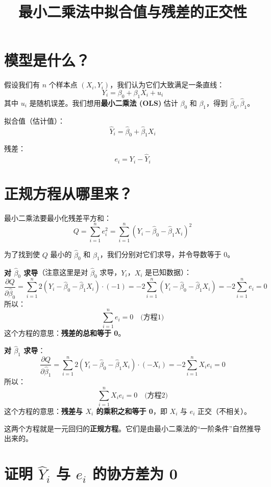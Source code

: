 \documentclass[12pt]{article}
\title{最小二乘法中拟合值与残差的正交性}
\author{}
\date{}
\begin{document}
\maketitle

\section{模型是什么？}

假设我们有 \(n\) 个样本点 \((X_i, Y_i)\)，我们认为它们大致满足一条直线：
\[
Y_i = \beta_0 + \beta_1 X_i + u_i
\]
其中 \(u_i\) 是随机误差。我们想用\textbf{最小二乘法 (OLS)} 估计 \(\beta_0\) 和 \(\beta_1\)，得到 \(\hat{\beta}_0, \hat{\beta}_1\)。

拟合值（估计值）：
\[
\hat{Y}_i = \hat{\beta}_0 + \hat{\beta}_1 X_i
\]

残差：
\[
e_i = Y_i - \hat{Y}_i
\]

\section{正规方程从哪里来？}

最小二乘法要最小化残差平方和：
\[
Q = \sum_{i=1}^n e_i^2 = \sum_{i=1}^n (Y_i - \hat{\beta}_0 - \hat{\beta}_1 X_i)^2
\]

为了找到使 \(Q\) 最小的 \(\hat{\beta}_0\) 和 \(\hat{\beta}_1\)，我们分别对它们求导，并令导数等于 0。

\textbf{对 \(\hat{\beta}_0\) 求导}（注意这里是对 \(\hat{\beta}_0\) 求导，\(Y_i\)，\(X_i\) 是已知数据）：
\[
\frac{\partial Q}{\partial \hat{\beta}_0} = \sum_{i=1}^n 2(Y_i - \hat{\beta}_0 - \hat{\beta}_1 X_i) \cdot (-1) = -2\sum_{i=1}^n (Y_i - \hat{\beta}_0 - \hat{\beta}_1 X_i) = -2\sum_{i=1}^n e_i = 0
\]
所以：
\[
\sum_{i=1}^n e_i = 0 \quad \text{(方程1)}
\]
这个方程的意思：\textbf{残差的总和等于 0}。

\textbf{对 \(\hat{\beta}_1\) 求导}：
\[
\frac{\partial Q}{\partial \hat{\beta}_1} = \sum_{i=1}^n 2(Y_i - \hat{\beta}_0 - \hat{\beta}_1 X_i) \cdot (-X_i) = -2\sum_{i=1}^n X_i e_i = 0
\]
所以：
\[
\sum_{i=1}^n X_i e_i = 0 \quad \text{(方程2)}
\]
这个方程的意思：\textbf{残差与 \(X_i\) 的乘积之和等于 0}，即 \(X_i\) 与 \(e_i\) 正交（不相关）。

这两个方程就是一元回归的\textbf{正规方程}。它们是由最小二乘法的“一阶条件”自然推导出来的。

\section{证明 \(\hat{Y}_i\) 与 \(e_i\) 的协方差为 0}
\end{document}
